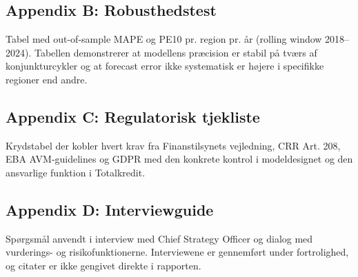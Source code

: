 \documentclass[12pt]{article}
\begin{document}
\subsection*{Appendix B: Robusthedstest}
Tabel med out-of-sample MAPE og PE10 pr. region pr. år (rolling window 2018--2024). Tabellen demonstrerer at modellens præcision er stabil på tværs af konjunkturcykler og at forecast error ikke systematisk er højere i specifikke regioner end andre.

\subsection*{Appendix C: Regulatorisk tjekliste}
Krydstabel der kobler hvert krav fra Finanstilsynets vejledning, CRR Art. 208, EBA AVM-guidelines og GDPR med den konkrete kontrol i modeldesignet og den ansvarlige funktion i Totalkredit.

\subsection*{Appendix D: Interviewguide}
Spørgsmål anvendt i interview med Chief Strategy Officer og dialog med vurderings- og risikofunktionerne. Interviewene er gennemført under fortrolighed, og citater er ikke gengivet direkte i rapporten.
\end{document}
